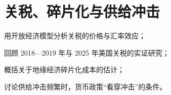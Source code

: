 \chapter{关税、碎片化与供给冲击}\label{ch:fragmentation}

\begin{chapterguide}
\begin{guidegoals}
\item 用开放经济模型分析关税的价格与汇率效应；
\item 回顾 2018—2019 年与 2025 年美国关税的实证研究；
\item 概括关于地缘经济碎片化成本的估计；
\item 讨论供给冲击频繁时，货币政策“看穿冲击”的条件。
\end{guidegoals}
\end{chapterguide}

\chapterstub
